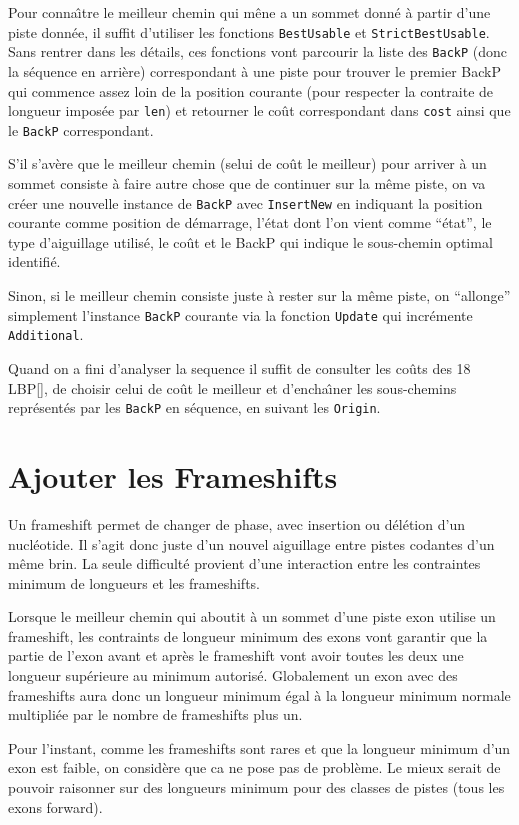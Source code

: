 \documentclass[a4paper]{article}
\begin{document}
Pour conna\^\i tre le meilleur chemin qui m\^ene a un sommet donn\'e \`a partir
d'une piste donn\'ee, il suffit d'utiliser les fonctions
\texttt{BestUsable} et \texttt{StrictBestUsable}. Sans rentrer dans
les d\'etails, ces fonctions vont parcourir la liste des \texttt{BackP}
(donc la s\'equence en arri\`ere) correspondant \`a une piste pour trouver
le premier BackP qui commence assez loin de la position courante (pour
respecter la contraite de longueur impos\'ee par \texttt{len}) et
retourner le co\^ut correspondant dans \texttt{cost} ainsi que le
\texttt{BackP} correspondant.

S'il s'av\`ere que le meilleur chemin (selui de co\^ut le meilleur) pour
arriver \`a un sommet consiste \`a faire autre chose que de continuer sur
la m\^eme piste, on va cr\'eer une nouvelle instance de \texttt{BackP}
avec \texttt{InsertNew} en indiquant la position courante comme
position de d\'emarrage, l'\'etat dont l'on vient comme ``\'etat'', le type
d'aiguillage utilis\'e, le co\^ut et le BackP qui indique le sous-chemin
optimal identifi\'e.

Sinon, si le meilleur chemin consiste juste \`a rester sur la m\^eme
piste, on ``allonge'' simplement l'instance \texttt{BackP} courante
via la fonction \texttt{Update} qui incr\'emente \texttt{Additional}.

Quand on a fini d'analyser la sequence il suffit de consulter les
co\^uts des 18 LBP[], de choisir celui de co\^ut le meilleur et
d'encha\^\i ner les sous-chemins repr\'esent\'es par les \texttt{BackP} en
s\'equence, en suivant les \texttt{Origin}.

\section{Ajouter les Frameshifts}

Un frameshift permet de changer de phase, avec insertion ou d\'el\'etion
d'un nucl\'eotide. Il s'agit donc juste d'un nouvel aiguillage entre
pistes codantes d'un m\^eme brin. La seule difficult\'e provient d'une
interaction entre les contraintes minimum de longueurs et les
frameshifts.

Lorsque le meilleur chemin qui aboutit \`a un sommet d'une piste exon
utilise un frameshift, les contraints de longueur minimum des exons
vont garantir que la partie de l'exon avant et apr\`es le frameshift
vont avoir toutes les deux une longueur sup\'erieure au minimum
autoris\'e. Globalement un exon avec des frameshifts aura donc un
longueur minimum \'egal \`a la longueur minimum normale multipli\'ee par le
nombre de frameshifts plus un.

Pour l'instant, comme les frameshifts sont rares et que la longueur
minimum d'un exon est faible, on consid\`ere que ca ne pose pas de
probl\`eme. Le mieux serait de pouvoir raisonner sur des longueurs
minimum pour des classes de pistes (tous les exons forward).
\end{document}
